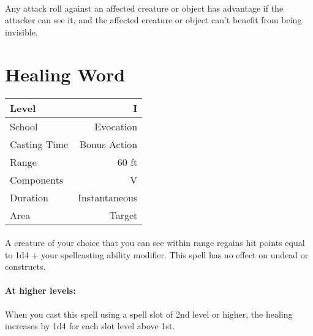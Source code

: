 \documentclass[a5paper,12pt]{article}
\begin{document}
\paragraph{}
Any attack roll against an affected creature or object has advantage if the attacker can see it, and the affected creature or object can't benefit from being invisible.

\newpage

\section*{Healing Word}
\begin{table}[h]
   \centering
   \begin{tabular}{|l|r|}
      \hline
      Level        & I \\
      \hline
      School       & Evocation \\
      \hline
      Casting Time & Bonus Action \\
      \hline
      Range        & 60 ft \\
      \hline
      Components   & V \\
      \hline
      Duration     & Instantaneous \\
      \hline
      Area         & Target \\
      \hline
   \end{tabular}
\end{table}

\paragraph{}
A creature of your choice that you can see within range regains hit points equal to 1d4 + your spellcasting ability modifier. This spell has no effect on undead or constructs.

\paragraph{At higher levels:}
When you cast this spell using a spell slot of 2nd level or higher, the healing increases by 1d4 for each slot level above 1st.

\newpage
\end{document}
